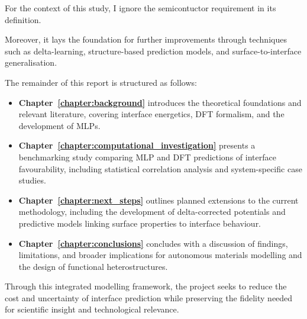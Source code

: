 For the context of this study, I ignore the semicontuctor requirement in its definition.

Moreover, it lays the foundation for further improvements through techniques such as delta-learning, structure-based
prediction models, and surface-to-interface generalisation.

\label{para:report_structure} %

The remainder of this report is structured as follows:


\begin{itemize}

    \item \textbf{Chapter~\ref{chapter:background}} introduces the theoretical foundations and relevant literature,
    covering interface energetics, DFT formalism, and the development of MLPs.

    \item \textbf{Chapter~\ref{chapter:computational_investigation}} presents a benchmarking study comparing MLP and DFT
    predictions of interface favourability, including statistical correlation analysis and system-specific case studies.

    \item \textbf{Chapter~\ref{chapter:next_steps}} outlines planned extensions to the current methodology, including
    the development of delta-corrected potentials and predictive models linking surface properties to interface
    behaviour.

    \item \textbf{Chapter~\ref{chapter:conclusions}} concludes with a discussion of findings, limitations, and broader
    implications for autonomous materials modelling and the design of functional heterostructures.

\end{itemize}


\label{para:framework_objective} %

Through this integrated modelling framework, the project seeks to reduce the cost and uncertainty of interface
prediction while preserving the fidelity needed for scientific insight and technological relevance.

